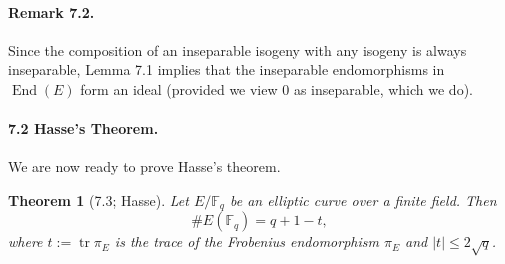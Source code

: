 \documentclass[UTF8,11pt]{ctexart}
\newtheorem*{theorem}{Theorem}
\newcommand{\End}{\operatorname{End}}
\newcommand{\tr}{\operatorname{tr}}
\begin{document}
\paragraph{Remark 7.2.}
Since the composition of an inseparable isogeny with any isogeny is always inseparable, Lemma 7.1 implies that the inseparable endomorphisms in $\End(E)$ form an ideal (provided we view $0$ as inseparable, which we do).

\paragraph{7.2 Hasse's Theorem.}
We are now ready to prove Hasse's theorem.
\begin{theorem}[7.3; Hasse]
Let $E/\mathbb F_q$ be an elliptic curve over a finite field. Then
\[
\#E(\mathbb F_q)=q+1-t,
\]
where $t:=\tr\pi_E$ is the trace of the Frobenius endomorphism $\pi_E$ and $|t|\le2\sqrt q$.
\end{theorem}
\end{document}
